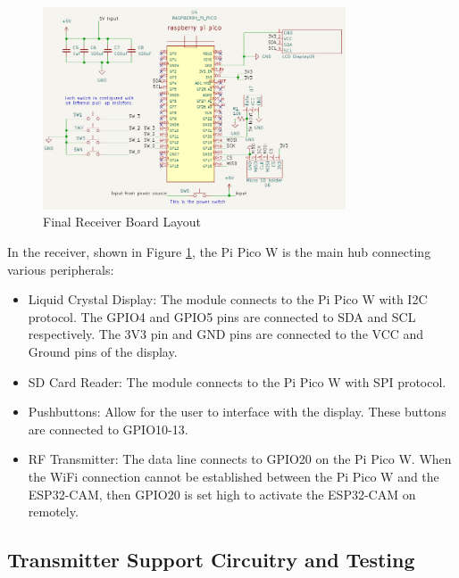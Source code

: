 \documentclass[class=report,11pt,crop=false]{standalone}
\begin{document}
\begin{figure}[h]
\centering
\includegraphics[width=0.8\textwidth]{Images/Receiver_layout.png}
\caption{Final Receiver Board Layout}
\label{fig:R_Schem}
\end{figure}

In the receiver, shown in Figure \ref{fig:R_Schem}, the Pi Pico W is the main hub connecting various peripherals:
\begin{itemize}
    \item Liquid Crystal Display: The module connects to the Pi Pico W with I2C protocol. The GPIO4 and GPIO5 pins are connected to SDA and SCL respectively. The 3V3 pin and GND pins are connected to the VCC and Ground pins of the display. 
    \item SD Card Reader: The module connects to the Pi Pico W with SPI protocol. 
    \item Pushbuttons: Allow for the user to interface with the display. These buttons are connected to GPIO10-13. 
    \item RF Transmitter: The data line connects to GPIO20 on the Pi Pico W. When the WiFi connection cannot be established between the Pi Pico W and the ESP32-CAM, then GPIO20 is set high to activate the ESP32-CAM on remotely. 
\end{itemize}



\subsection{Transmitter Support Circuitry and Testing}
\end{document}
